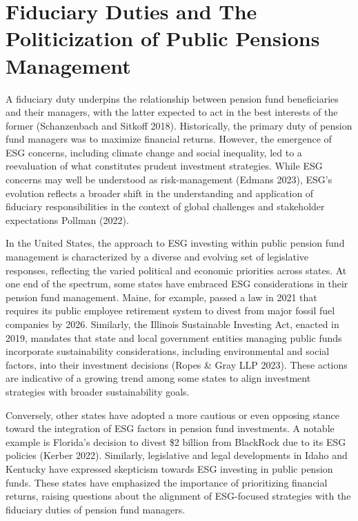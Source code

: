 \documentclass[
  12pt,
]{article}
\begin{document}
\hypertarget{fiduciary-duties-and-the-politicization-of-public-pensions-management}{%
\section{Fiduciary Duties and The Politicization of Public Pensions Management}\label{fiduciary-duties-and-the-politicization-of-public-pensions-management}}

A fiduciary duty underpins the relationship between pension fund beneficiaries and their managers, with the latter expected to act in the best interests of the former (Schanzenbach and Sitkoff 2018). Historically, the primary duty of pension fund managers was to maximize financial returns. However, the emergence of ESG concerns, including climate change and social inequality, led to a reevaluation of what constitutes prudent investment strategies. While ESG concerns may well be understood as risk-management (Edmans 2023), ESG's evolution reflects a broader shift in the understanding and application of fiduciary responsibilities in the context of global challenges and stakeholder expectations Pollman (2022).

In the United States, the approach to ESG investing within public pension fund management is characterized by a diverse and evolving set of legislative responses, reflecting the varied political and economic priorities across states. At one end of the spectrum, some states have embraced ESG considerations in their pension fund management. Maine, for example, passed a law in 2021 that requires its public employee retirement system to divest from major fossil fuel companies by 2026. Similarly, the Illinois Sustainable Investing Act, enacted in 2019, mandates that state and local government entities managing public funds incorporate sustainability considerations, including environmental and social factors, into their investment decisions (Ropes \& Gray LLP 2023). These actions are indicative of a growing trend among some states to align investment strategies with broader sustainability goals.

Conversely, other states have adopted a more cautious or even opposing stance toward the integration of ESG factors in pension fund investments. A notable example is Florida's decision to divest \$2 billion from BlackRock due to its ESG policies (Kerber 2022). Similarly, legislative and legal developments in Idaho and Kentucky have expressed skepticism towards ESG investing in public pension funds. These states have emphasized the importance of prioritizing financial returns, raising questions about the alignment of ESG-focused strategies with the fiduciary duties of pension fund managers.
\end{document}
